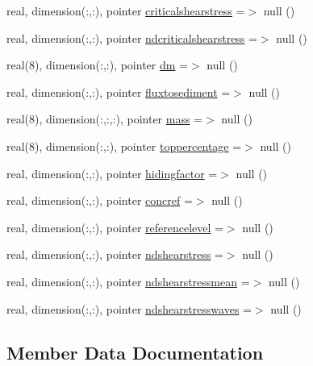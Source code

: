 \begin{DoxyCompactItemize}
real, dimension(\+:,\+:), pointer \mbox{\hyperlink{structmodulesediment_1_1t__sand_a13639f7b965b278ff49ca5acd19a56e1}{criticalshearstress}} =$>$ null ()
\item 
real, dimension(\+:,\+:), pointer \mbox{\hyperlink{structmodulesediment_1_1t__sand_ad515fc88728b778d05cae5b040906a31}{ndcriticalshearstress}} =$>$ null ()
\item 
real(8), dimension(\+:,\+:), pointer \mbox{\hyperlink{structmodulesediment_1_1t__sand_a172c9e06a90b1334089150097be62335}{dm}} =$>$ null ()
\item 
real, dimension(\+:,\+:), pointer \mbox{\hyperlink{structmodulesediment_1_1t__sand_a33eddbce3f3db27248556a964ce117cb}{fluxtosediment}} =$>$ null ()
\item 
real(8), dimension(\+:,\+:,\+:), pointer \mbox{\hyperlink{structmodulesediment_1_1t__sand_ab097cbfae5af6d7f5b85a17296821d39}{mass}} =$>$ null ()
\item 
real(8), dimension(\+:,\+:), pointer \mbox{\hyperlink{structmodulesediment_1_1t__sand_a4a19a9ce76d539fb943641e390d17d80}{toppercentage}} =$>$ null ()
\item 
real, dimension(\+:,\+:), pointer \mbox{\hyperlink{structmodulesediment_1_1t__sand_a15b9f1b902319af8a2ce161960025abd}{hidingfactor}} =$>$ null ()
\item 
real, dimension(\+:,\+:), pointer \mbox{\hyperlink{structmodulesediment_1_1t__sand_a779a02e9f23ba15509a76633c340d0a7}{concref}} =$>$ null ()
\item 
real, dimension(\+:,\+:), pointer \mbox{\hyperlink{structmodulesediment_1_1t__sand_a639d9c2c2e0f29ed58a3127f473dadf4}{referencelevel}} =$>$ null ()
\item 
real, dimension(\+:,\+:), pointer \mbox{\hyperlink{structmodulesediment_1_1t__sand_a8d6439aaf9ad741da11a7f2eed0be9be}{ndshearstress}} =$>$ null ()
\item 
real, dimension(\+:,\+:), pointer \mbox{\hyperlink{structmodulesediment_1_1t__sand_a2e50a24e4d529044f750d4661a05a974}{ndshearstressmean}} =$>$ null ()
\item 
real, dimension(\+:,\+:), pointer \mbox{\hyperlink{structmodulesediment_1_1t__sand_aaf866ff87d30816b835cf686c59c35eb}{ndshearstresswaves}} =$>$ null ()
\end{DoxyCompactItemize}


\subsection{Member Data Documentation}
\mbox{\label{structmodulesediment_1_1t__sand_ac67aa5cc53bbfdd21cc079d21e12bdff}} 
